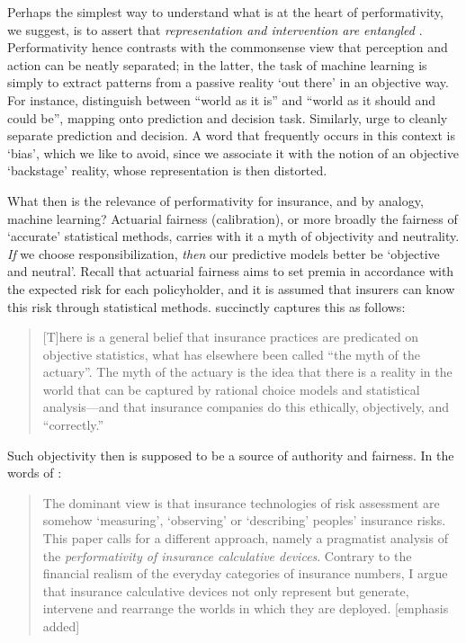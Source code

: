 \documentclass[11pt]{article} %
\begin{document}
Perhaps the simplest way to understand what is at the heart of performativity, we suggest, is to assert that \textit{representation and intervention are entangled} \citep{vosselman2014performativity}. 
Performativity hence contrasts with the commonsense view that perception and action can be neatly separated; in the latter, the task of machine learning is simply to extract patterns from a passive reality `out there' in an objective way.
For instance, \citet{mitchell2021algorithmic} distinguish between ``world as it is'' and ``world as it should and could be'', mapping onto prediction and decision task. Similarly, \citet{kuppler2021distributive} urge to cleanly separate prediction and decision.
A word that frequently occurs in this context is `bias', which we like to avoid, since we associate it with the notion of an objective `backstage' reality, whose representation is then distorted. 

What then is the relevance of performativity for insurance, and by analogy, machine learning? Actuarial fairness (calibration), or more broadly the fairness of `accurate' statistical methods, carries with it a myth of objectivity and neutrality. \textit{If} we choose responsibilization, \textit{then} our predictive models better be `objective and neutral'. Recall that actuarial fairness aims to set premia in accordance with the expected risk for each policyholder, and it is assumed that insurers can know this risk through statistical methods. \citet{glenn2003postmodernism} succinctly captures this as follows:
\begin{quote}
    [T]here is a general belief that
insurance practices are predicated on objective statistics, what has elsewhere been called
“the myth of the actuary”. The myth of the actuary is the idea that there
is a reality in the world that can be captured by rational choice models and statistical
analysis—and that insurance companies do this ethically, objectively, and “correctly.”
\end{quote}
Such objectivity then is supposed to be a source of authority and fairness. In the words of \citet{van2014politics}:
\begin{quote}
    The dominant view is that
insurance technologies of risk assessment are somehow ‘measuring’, ‘observing’ or
‘describing’ peoples’ insurance risks. This paper calls for a different approach, namely a
pragmatist analysis of the \textit{performativity of insurance calculative devices}. Contrary to the
financial realism of the everyday categories of insurance numbers, I argue that insurance
calculative devices not only represent but generate, intervene and rearrange the worlds in
which they are deployed. [emphasis added]
\end{quote}
\end{document}
